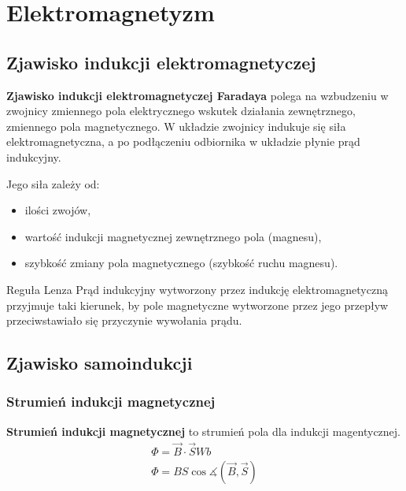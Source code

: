 \chapter{Elektromagnetyzm}
\section{Zjawisko indukcji elektromagnetyczej}\label{faraday}

\begin{definition}
  \textbf{Zjawisko indukcji elektromagnetyczej Faradaya} polega na wzbudzeniu w zwojnicy zmiennego
  pola elektrycznego wskutek działania zewnętrznego, zmiennego pola magnetycznego. W układzie
  zwojnicy indukuje się siła elektromagnetyczna, a po podłączeniu odbiornika w układzie płynie prąd
  indukcyjny.

  \vspace{1em}\noindent Jego siła zależy od:
  \begin{itemize}
    \item ilości zwojów,
    \item wartość indukcji magnetycznej zewnętrznego pola (magnesu),
    \item szybkość zmiany pola magnetycznego (szybkość ruchu magnesu).
  \end{itemize}
\end{definition}

\begin{law}{Reguła Lenza}
  Prąd indukcyjny wytworzony przez indukcję elektromagnetyczną przyjmuje taki kierunek, by pole
  magnetyczne wytworzone przez jego przepływ przeciwstawiało się przyczynie wywołania prądu.
\end{law}

\section{Zjawisko samoindukcji}
\subsection{Strumień indukcji magnetycznej}

\begin{definition}
  \textbf{Strumień indukcji magnetycznej} to strumień pola dla indukcji magentycznej.
  \begin{equation}
    \begin{gathered}
      \Phi = \vec B\cdot\vec S\unit{Wb}\\
      \Phi = BS\cos\measuredangle(\vec B, \vec S)
    \end{gathered}
  \end{equation}
\end{definition}

